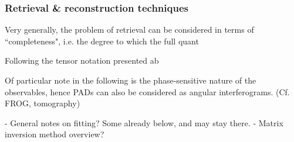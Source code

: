 \subsubsection{Retrieval \& reconstruction techniques}

Very generally, the problem of retrieval can be considered in terms of ``completeness", i.e. the degree to which the full quant

Following the tensor notation presented ab

Of particular note in the following is the phase-sensitive nature of the observables, hence PADs can also be considered as angular interferograms. (Cf. FROG, tomography)

- General notes on fitting? Some already below, and may stay there.
- Matrix inversion method overview?